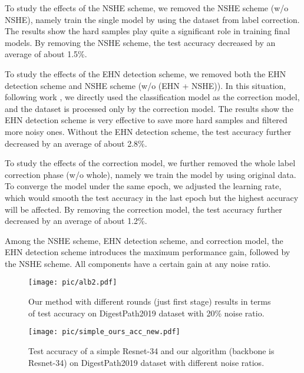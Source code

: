 To study the effects of the NSHE scheme, we removed the NSHE scheme (w/o NSHE), namely train the single model by using the dataset from label correction. The results show the hard samples play quite a significant role in training final models. By removing the NSHE scheme, the test accuracy decreased by an average of about 1.5\%.

{To study the effects of the EHN detection scheme, we removed both the EHN detection scheme and NSHE scheme (w/o (EHN + NSHE)). In this situation, following work \cite{tanaka2018joint}, we directly used the classification model as the correction model, and the dataset is processed only by the correction model. The results show the EHN detection scheme is very effective to save more hard samples and filtered more noisy ones. Without the EHN detection scheme, the test accuracy further decreased by an average of about 2.8\%.}

{To study the effects of the correction model, we further removed the whole label correction phase (w/o whole), namely we train the model by using original data. To converge the model under the same epoch, we adjusted the learning rate, which would smooth the test accuracy in the last epoch but the highest accuracy will be affected. By removing the correction model, the test accuracy further decreased by an average of about 1.2\%.}

Among the NSHE scheme, EHN detection scheme, and correction model, the EHN detection scheme introduces the maximum performance gain, followed by the NSHE scheme. All components have a certain gain at any noise ratio.

\begin{figure}[]
  \centering
  \texttt{[image: pic/alb2.pdf]}
\caption{{Our method with different rounds (just first stage) results in terms of test accuracy on DigestPath2019 dataset with 20\% noise ratio.}}
  \label{fig:alb2}
\end{figure}

\begin{figure}[]
  \centering
  \texttt{[image: pic/simple\_ours\_acc\_new.pdf]}
\caption{{Test accuracy of a simple Resnet-34 and our algorithm (backbone is Resnet-34) on DigestPath2019 dataset with different noise ratios.}}
  \label{fig:simple_ours}
\end{figure}

